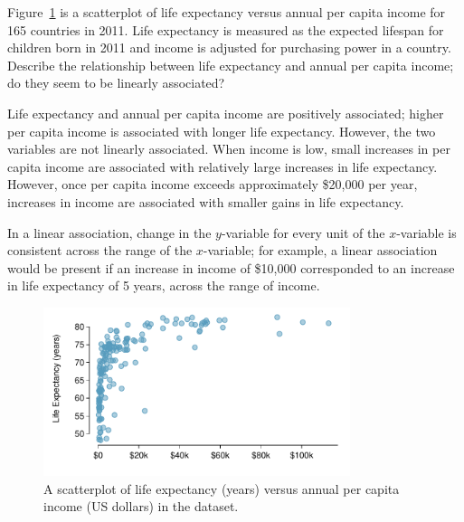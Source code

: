 \begin{examplewrap}
\begin{nexample}{Figure~\ref{incomeLifeExpectancy} is a scatterplot of life expectancy versus annual per capita income for 165 countries in 2011. Life expectancy is measured as the expected lifespan for children born in 2011 and income is adjusted for purchasing power in a country. Describe the relationship between life expectancy and annual per capita income; do they seem to be linearly associated?}

Life expectancy and annual per capita income are positively associated; higher per capita income is associated with longer life expectancy. However, the two variables are not linearly associated. When income is low, small increases in per capita income are associated with relatively large increases in life expectancy. However, once per capita income exceeds approximately \$20,000 per year, increases in income are associated with smaller gains in life expectancy. 

In a linear association, change in the $y$-variable for every unit of the $x$-variable is consistent across the range of the $x$-variable; for example, a linear association would be present if an increase in income of \$10,000 corresponded to an increase in life expectancy of 5 years, across the range of income.
\end{nexample}
\end{examplewrap}

\begin{figure}[h]
	\centering
	\includegraphics[width=0.8\textwidth]
	{ch_intro_to_data_oi_biostat/figures/wdiIncomeLifeExpectancy/wdiIncomeLifeExpectancy.pdf}
	\caption{A scatterplot of life expectancy (years) versus annual per capita income (US dollars) in the  dataset.}
	\label{incomeLifeExpectancy}
\end{figure}


